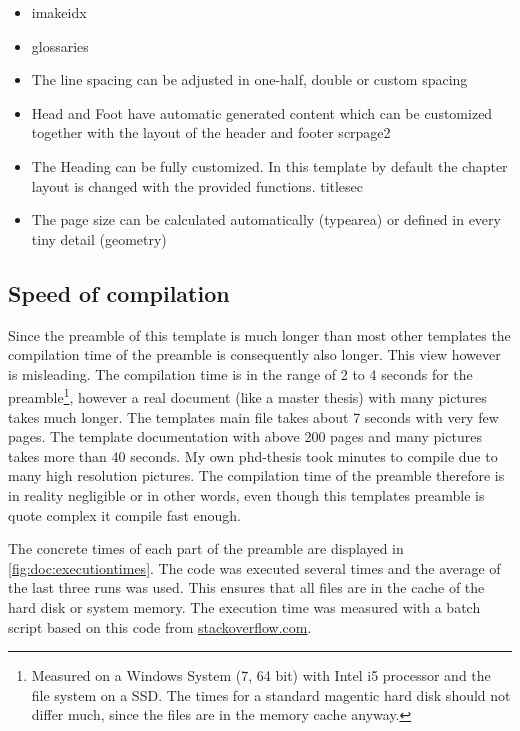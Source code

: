 \begin{itemize}
\item imakeidx
\item glossaries
\end{itemize}

\begin{itemize}
\item The line spacing can be adjusted in one-half, double or custom spacing
\item Head and Foot have automatic generated content which can be customized together with the layout of the header and footer scrpage2
\item The Heading can be fully customized. In this template by default the chapter layout is changed with the provided functions. titlesec
\item The page size can be calculated automatically (typearea) or defined in every tiny detail (geometry)
\end{itemize}

\subsection{Speed of compilation}
Since the preamble of this template is much longer than most other templates the compilation time of the preamble is consequently also longer. This view however is misleading. The compilation time is in the range of 2 to 4 seconds for the preamble\footnote{Measured on a Windows System (7, 64 bit) with Intel i5 processor and the file system on a SSD. The times for a standard magentic hard disk should not differ much, since the files are in the memory cache anyway.}, however a real document (like a master thesis) with many pictures takes much longer. The templates main file takes about 7 seconds with very few pages. The template documentation with above 200 pages and many pictures takes more than 40 seconds. My own phd-thesis took minutes to compile due to many high resolution pictures. The compilation time of the preamble therefore is in reality negligible or in other words, even though this templates preamble is quote complex it compile fast enough.

The concrete times of each part of the preamble are displayed in \cref{fig:doc:executiontimes}. The code was executed several times and the average of the last three runs was used. This ensures that all files are in the cache of the hard disk or system memory. The execution time was measured with a batch script based on this code from \href{http://stackoverflow.com/questions/4313897/timer-in-dos-batch-file}{stackoverflow.com}. 

